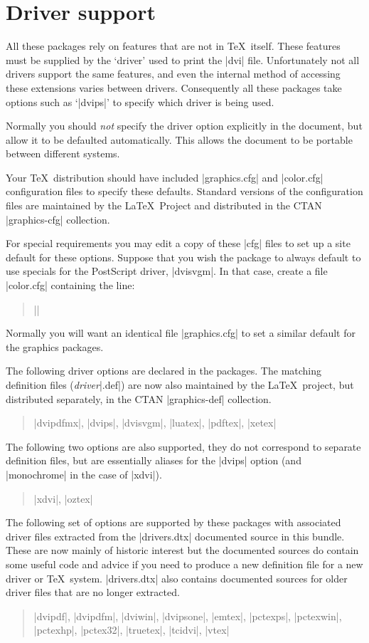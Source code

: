 \section{Driver support}\label{drivers}
All these packages rely on features that are not in \TeX\ itself.
These features must be supplied by the `driver' used to print the
|dvi| file. Unfortunately not all drivers support the same features, and
even the internal method of accessing these extensions varies between
drivers. Consequently all these packages take options such as
`|dvips|' to specify which driver is being used.

Normally you should \emph{not} specify the driver option explicitly
in the document, but allow it to be defaulted automatically.
This allows the document to be portable between different systems.

Your \TeX\ distribution should have included |graphics.cfg| and
|color.cfg| configuration files to specify these defaults.
Standard versions of the configuration files are maintained by the
\LaTeX\ Project and distributed in the CTAN |graphics-cfg| collection.

For special requirements you may edit a copy of these |cfg| files
to set up a site default for these options. Suppose that you wish
the  package to always default to use specials for the
PostScript driver, |dvisvgm|. In that case, create a file |color.cfg|
containing the line:
\begin{quote}
  ||
\end{quote}
Normally you will want an identical file |graphics.cfg| to set a similar
default for the graphics packages.

The following driver options are declared in the packages.
The matching definition files (\emph{driver}|.def|)
are now also maintained by the \LaTeX\ project,
but distributed separately, in the CTAN |graphics-def| collection.
\begin{quote}\raggedright
  |dvipdfmx|, |dvips|, |dvisvgm|, |luatex|, |pdftex|, |xetex|
\end{quote}


The following two options are also supported, they do not correspond
to separate definition files, but are essentially aliases for the
|dvips| option (and |monochrome| in the case of |xdvi|).
\begin{quote}\raggedright
 |xdvi|, |oztex|
\end{quote}

The following set of options are supported by these packages
with associated driver files extracted from the |drivers.dtx|
documented source in this bundle. These are now mainly of historic
interest but the documented sources do contain some useful code
and advice if you need to produce a new definition file for a new
driver or \TeX\ system. |drivers.dtx| also contains documented
sources for older driver files that are no longer extracted.
\begin{quote}\raggedright
 |dvipdf|, |dvipdfm|, |dviwin|, |dvipsone|,
 |emtex|, |pctexps|, |pctexwin|,  |pctexhp|, |pctex32|,
 |truetex|, |tcidvi|, |vtex|
\end{quote}

